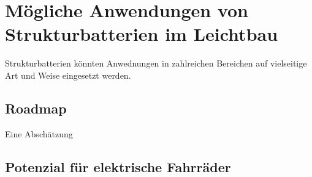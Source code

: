 \chapter{Mögliche Anwendungen von Strukturbatterien im Leichtbau}

Strukturbatterien könnten Anwednungen in zahlreichen Bereichen auf vielseitige Art und Weise eingesetzt werden. 



\section{Roadmap}
Eine Abschätzung 


\section{Potenzial für elektrische Fahrräder}
